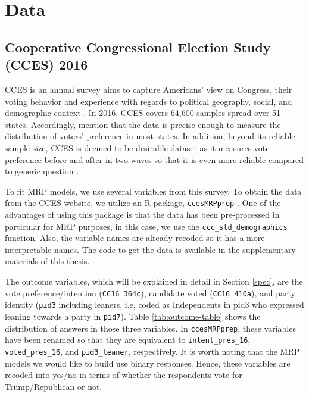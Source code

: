 \documentclass{monashthesis}
\begin{document}
\hypertarget{data}{%
\section{Data}\label{data}}

\hypertarget{cooperative-congressional-election-study-cces-2016}{%
\subsection{Cooperative Congressional Election Study (CCES) 2016}\label{cooperative-congressional-election-study-cces-2016}}

CCES is an annual survey aims to capture Americans' view on Congress, their voting behavior and experience with regards to political geography, social, and demographic context \autocite{cces_data}. In 2016, CCES covers 64,600 samples spread over 51 states. Accordingly, \textcite{cces_data} mention that the data is precise enough to measure the distribution of voters' preference in most states. In addition, beyond its reliable sample size, CCES is deemed to be desirable dataset as it measures vote preference before and after in two waves so that it is even more reliable compared to generic question \autocite{kuriwaki}.

To fit MRP models, we use several variables from this survey. To obtain the data from the CCES website, we utilize an R package, \texttt{ccesMRPprep} \autocite{ccesmrpprep}. One of the advantages of using this package is that the data has been pre-processed in particular for MRP purposes, in this case, we use the \texttt{ccc\_std\_demographics} function. Also, the variable names are already recoded so it has a more interpretable names. The code to get the data is available in the supplementary materials of this thesis.

The outcome variables, which will be explained in detail in Section \ref{spec}, are the vote preference/intention (\texttt{CC16\_364c}), candidate voted (\texttt{CC16\_410a}), and party identity (\texttt{pid3} including leaners, i.e, coded as Independents in pid3 who expressed leaning towards a party in \texttt{pid7}). Table \ref{tab:outcome-table} shows the distribution of answers in those three variables. In \texttt{ccesMRPprep}, these variables have been renamed so that they are equivalent to \texttt{intent\_pres\_16}, \texttt{voted\_pres\_16}, and \texttt{pid3\_leaner}, respectively. It is worth noting that the MRP models we would like to build use binary responses. Hence, these variables are recoded into yes/no in terms of whether the respondents vote for Trump/Republican or not.
\end{document}
